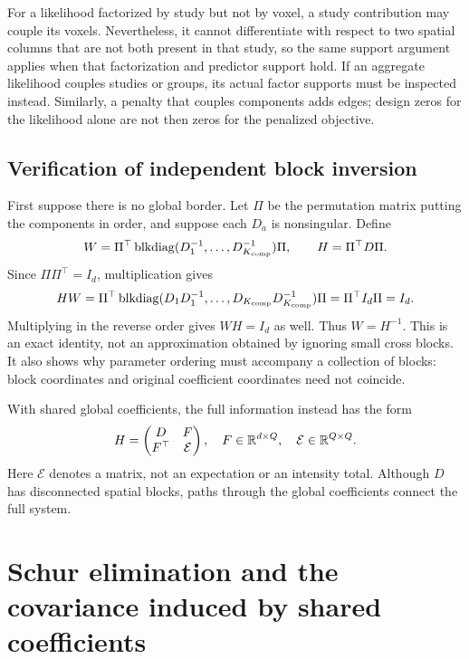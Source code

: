 For a likelihood factorized by study but not by voxel, a study contribution
may couple its voxels.  Nevertheless, it cannot differentiate with respect
to two spatial columns that are not both present in that study, so the
same support argument applies when that factorization and predictor support
hold.  If an aggregate likelihood couples studies or groups, its actual
factor supports must be inspected instead.  Similarly, a penalty that
couples components adds edges; design zeros for the likelihood alone
are not then zeros for the penalized objective.

\subsection{Verification of independent block inversion}
\label{cov-block-verification}

First suppose there is no global border.  Let $\Pi$ be the permutation
matrix putting the components in order, and suppose each $D_a$ is
nonsingular.  Define
\[
 W=\Pi^\top\operatorname{blkdiag}(D_1^{-1},\ldots,D_{K_{\mathrm{comp}}}^{-1})\Pi,
 \qquad H=\Pi^\top D\Pi .
\]
Since $\Pi\Pi^\top=I_d$, multiplication gives
\[
 HW
 =\Pi^\top
   \operatorname{blkdiag}(D_1D_1^{-1},\ldots,D_{K_{\mathrm{comp}}}
                                  D_{K_{\mathrm{comp}}}^{-1})\Pi
 =\Pi^\top I_d\Pi=I_d .
\]
Multiplying in the reverse order gives $WH=I_d$ as well.  Thus $W=H^{-1}$.
This is an exact identity, not an approximation obtained by ignoring small
cross blocks.  It also shows why parameter ordering must accompany a
collection of blocks: block coordinates and original coefficient
coordinates need not coincide.

With shared global coefficients, the full information instead has the form
\begin{equation}
 H=\begin{pmatrix}D&F\\F^\top&\mathcal E\end{pmatrix},
 \quad F\in\mathbb R^{d\times Q},\quad\mathcal E\in\mathbb R^{Q\times Q}.
 \label{cov-bordered-information}
\end{equation}
Here $\mathcal E$ denotes a matrix, not an expectation or an intensity
total.  Although $D$ has disconnected spatial blocks, paths through the
global coefficients connect the full system.

\section{Schur elimination and the covariance induced by shared coefficients}
\label{cov-schur}

